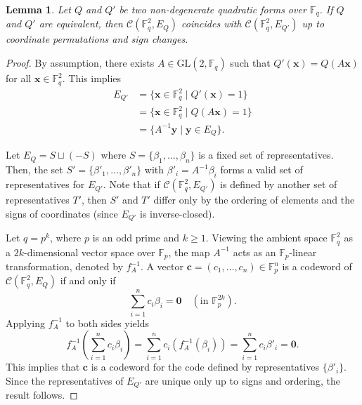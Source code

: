 \documentclass{amsart}
\newtheorem{lemma}[theorem]{Lemma}
\numberwithin{equation}{section}
\begin{document}
\begin{lemma}
Let $Q$ and $Q'$ be two non-degenerate quadratic forms over $\mathbb{F}_q$. If $Q$ and $Q'$ are equivalent, then $\mathcal{C}(\mathbb{F}_q^2, E_Q)$ coincides with $\mathcal{C}(\mathbb{F}_q^2, E_{Q'})$ up to coordinate permutations and sign changes.
\end{lemma}

\begin{proof}
By assumption, there exists $A \in \mathrm{GL}(2, \mathbb{F}_q)$ such that $Q'(\mathbf{x}) = Q(A\mathbf{x})$ for all $\mathbf{x} \in \mathbb{F}_q^2$. This implies
\begin{align*}
    E_{Q'} &= \{ \mathbf{x} \in \mathbb{F}_q^2 \mid Q'(\mathbf{x}) = 1 \} \\
    &= \{ \mathbf{x} \in \mathbb{F}_q^2 \mid Q(A\mathbf{x}) = 1 \} \\
    & = \{ A^{-1}\mathbf{y} \mid \mathbf{y} \in E_Q \}.
\end{align*}

Let $E_Q = S \sqcup (-S)$ where $S = \{ \beta_1, \dots, \beta_n \}$ is a fixed set of representatives.
Then, the set $S' = \{ \beta'_1, \dots, \beta'_n \}$ with $\beta'_i = A^{-1}\beta_i$ forms a valid set of representatives for $E_{Q'}$.
Note that if $\mathcal{C}(\mathbb{F}_q^2, E_{Q'})$ is defined by another set of representatives $T'$, then $S'$ and $T'$ differ only by the ordering of elements and the signs of coordinates (since $E_{Q'}$ is inverse-closed).

Let $q=p^k$, where $p$ is an odd prime and $k\geq 1$.
Viewing the ambient space $\mathbb{F}_q^2$ as a $2k$-dimensional vector space over $\mathbb{F}_p$, the map $A^{-1}$ acts as an $\mathbb{F}_p$-linear transformation, denoted by $f_A^{-1}$.
A vector $\mathbf{c} = (c_1, \dots, c_n) \in \mathbb{F}_p^n$ is a codeword of $\mathcal{C}(\mathbb{F}_q^2, E_Q)$ if and only if
\[
    \sum_{i=1}^n c_i \beta_i = \mathbf{0} \quad (\text{in } \mathbb{F}_p^{2k}).
\]
Applying $f_A^{-1}$ to both sides yields
\[
    f_A^{-1} \left( \sum_{i=1}^n c_i \beta_i \right) = \sum_{i=1}^n c_i (f_A^{-1}(\beta_i)) = \sum_{i=1}^n c_i \beta'_i = \mathbf{0}.
\]
This implies that $\mathbf{c}$ is a codeword for the code defined by representatives $\{\beta'_i\}$. Since the representatives of $E_{Q'}$ are unique only up to signs and ordering, the result follows.
\end{proof}
\end{document}
